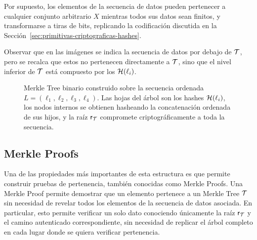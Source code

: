 Por supuesto, los elementos de la secuencia de datos pueden pertenecer a cualquier conjunto arbitrario $X$ mientras todos sus datos sean finitos, y transformarse a tiras de bits, replicando la codificación discutida en la Sección~\ref{sec:primitivas-criptograficas-hashes}.

Observar que en las imágenes se indica la secuencia de datos por debajo de $\mathcal{T}$, pero se recalca que estos no pertenecen directamente a $\mathcal{T}$, sino que el nivel inferior de $\mathcal{T}$ está compuesto por los $\mathcal{H}(\ell_i)$.

\begin{figure}[!t]
	\centering
	\caption{Merkle Tree binario construido sobre la secuencia ordenada $L=(\ell_1,\ell_2,\ell_3,\ell_4)$. Las hojas del árbol son los hashes $\mathcal{H}(\ell_i)$, los nodos internos se obtienen hasheando la concatenación ordenada de sus hijos, y la raíz $\mathsf{r}_{\mathcal{T}}$ compromete criptográficamente a toda la secuencia.}
	\label{fig:classic-merkle-tree}
\end{figure}

\subsection{Merkle Proofs}
\label{subsec:apendice-a-merkle-tree-merkle-proofs}

Una de las propiedades más importantes de esta estructura es que permite construir pruebas de pertenencia, también conocidas como Merkle Proofs. Una Merkle Proof permite demostrar que un elemento pertenece a un Merkle Tree $\mathcal{T}$ sin necesidad de revelar todos los elementos de la secuencia de datos asociada. En particular, esto permite verificar un solo dato conociendo únicamente la raíz $\mathsf{r}_{\mathcal{T}}$ y el camino autenticado correspondiente, sin necesidad de replicar el árbol completo en cada lugar donde se quiera verificar pertenencia.

